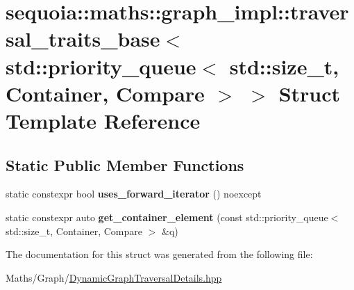 \hypertarget{structsequoia_1_1maths_1_1graph__impl_1_1traversal__traits__base_3_01std_1_1priority__queue_3_016b2f587e15cba411860610bd3f860d35}{}\section{sequoia\+::maths\+::graph\+\_\+impl\+::traversal\+\_\+traits\+\_\+base$<$ std\+::priority\+\_\+queue$<$ std\+::size\+\_\+t, Container, Compare $>$ $>$ Struct Template Reference}
\label{structsequoia_1_1maths_1_1graph__impl_1_1traversal__traits__base_3_01std_1_1priority__queue_3_016b2f587e15cba411860610bd3f860d35}
\subsection*{Static Public Member Functions}
\begin{DoxyCompactItemize}
\item 
\mbox{\label{structsequoia_1_1maths_1_1graph__impl_1_1traversal__traits__base_3_01std_1_1priority__queue_3_016b2f587e15cba411860610bd3f860d35_ab30e1be861a59d9ee0884872fc0d1d37}} 
static constexpr bool {\bfseries uses\+\_\+forward\+\_\+iterator} () noexcept
\item 
\mbox{\label{structsequoia_1_1maths_1_1graph__impl_1_1traversal__traits__base_3_01std_1_1priority__queue_3_016b2f587e15cba411860610bd3f860d35_a9da06d35386f1785730c961631bd5a36}} 
static constexpr auto {\bfseries get\+\_\+container\+\_\+element} (const std\+::priority\+\_\+queue$<$ std\+::size\+\_\+t, Container, Compare $>$ \&q)
\end{DoxyCompactItemize}


The documentation for this struct was generated from the following file\+:\begin{DoxyCompactItemize}
\item 
Maths/\+Graph/\mbox{\hyperlink{_dynamic_graph_traversal_details_8hpp}{Dynamic\+Graph\+Traversal\+Details.\+hpp}}\end{DoxyCompactItemize}
